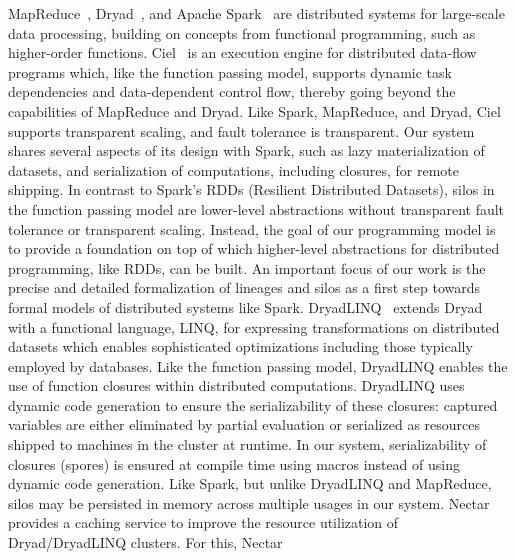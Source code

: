 \documentclass{jfp1}
\begin{document}

MapReduce~\cite{MapReduce}, Dryad~\cite{Dryad}, and Apache
Spark~\cite{Spark} are distributed systems for large-scale data
processing, building on concepts from functional programming, such as
higher-order functions. Ciel~\cite{Ciel} is an execution engine for
distributed data-flow programs which, like the function passing model,
supports dynamic task dependencies and data-dependent control flow,
thereby going beyond the capabilities of MapReduce and Dryad. Like
Spark, MapReduce, and Dryad, Ciel supports transparent scaling, and
fault tolerance is transparent. Our system shares several aspects of
its design with Spark, such as lazy materialization of datasets, and
serialization of computations, including closures, for remote
shipping. In contrast to Spark's RDDs (Resilient Distributed
Datasets), silos in the function passing model are lower-level
abstractions without transparent fault tolerance or transparent
scaling. Instead, the goal of our programming model is to provide a
foundation on top of which higher-level abstractions for distributed
programming, like RDDs, can be built. An important focus of our work
is the precise and detailed formalization of lineages and silos as a
first step towards formal models of distributed systems like Spark.
DryadLINQ~\cite{YuIFBEGC08} extends Dryad with a functional language,
LINQ, for expressing transformations on distributed datasets which
enables sophisticated optimizations including those typically employed
by databases. Like the function passing model, DryadLINQ enables the
use of function closures within distributed computations. DryadLINQ
uses dynamic code generation to ensure the serializability of these
closures: captured variables are either eliminated by partial
evaluation or serialized as resources shipped to machines in the
cluster at runtime. In our system, serializability of closures
(spores) is ensured at compile time using macros instead of using
dynamic code generation. Like Spark, but unlike DryadLINQ and
MapReduce, silos may be persisted in memory across multiple usages in
our system. Nectar~\cite{Nectar} provides a caching service to improve
the resource utilization of Dryad/DryadLINQ clusters. For this, Nectar
\end{document}
